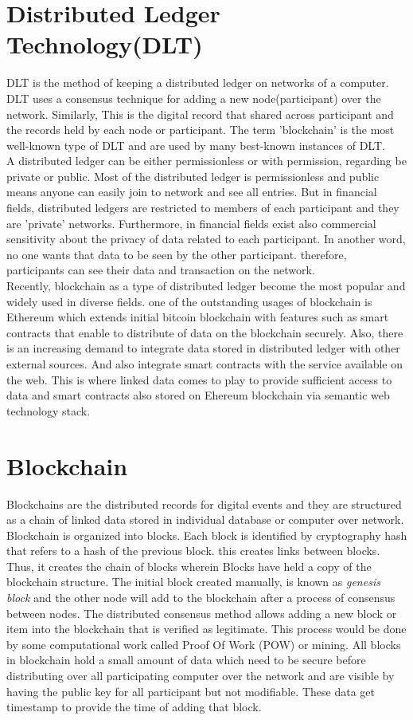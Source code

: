 \section{Distributed Ledger Technology(DLT)}
DLT is the method of keeping a distributed ledger on networks of a computer. DLT uses a consensus technique for adding a new node(participant) over the network. Similarly, This is the digital record that shared across participant and the records held by each node or participant. The term 'blockchain' is the most well-known type of DLT and are used by many best-known instances of DLT.\\
A distributed ledger can be either permissionless or with permission, regarding be private or public. 
Most of the distributed ledger is permissionless and public means anyone can easily join to network and see all entries. But in financial fields, distributed ledgers are restricted to members of each participant and they are 'private' networks. Furthermore, in financial fields exist also commercial sensitivity about the privacy of data related to each participant. In another word, no one wants that data to be seen by the other participant. therefore, participants can see their data and transaction on the network.\\
Recently, blockchain as a type of distributed ledger become the most popular and widely used in diverse fields.  one of the outstanding usages of blockchain is Ethereum which extends initial bitcoin blockchain with features such as smart contracts that enable to distribute of data on the blockchain securely.
Also, there is an increasing demand to integrate data stored in distributed ledger with other external sources. And also integrate smart contracts with the service available on the web. This is where linked data comes to play to provide sufficient access to data and smart contracts also stored on Ehereum blockchain via semantic web technology stack\cite{Third}.

\section{Blockchain}
Blockchains are the distributed records for digital events and they are structured as a chain of linked data stored in individual database or computer over network\cite{Third}.
Blockchain is organized into blocks. Each block is identified by cryptography hash that refers to a hash of the previous block. this creates links between blocks. Thus, it creates the chain of blocks wherein Blocks have held a copy of the blockchain structure. The initial block created manually, is known as \textit {genesis block} and the other node will add to the blockchain after a process of consensus between nodes. The distributed consensus method allows adding a new block or item into the blockchain that is verified as legitimate. This process would be done by some computational work called Proof Of Work (POW) or mining.
All blocks in blockchain hold a small amount of data which need to be secure before distributing over all participating computer over the network and are visible by having the public key for all participant but not modifiable. These data get timestamp to provide the time of adding that block.

